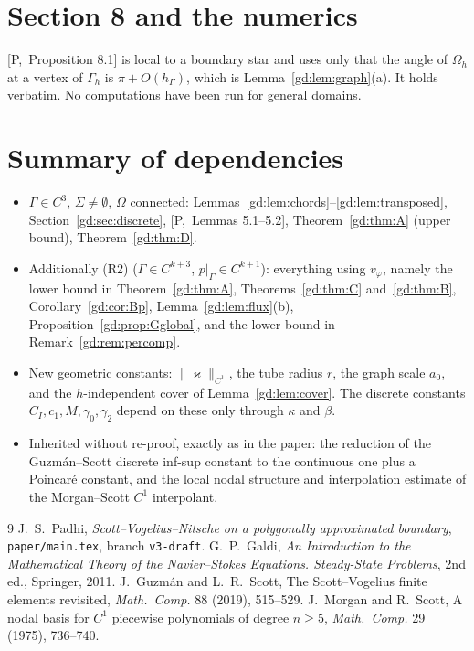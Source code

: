 \documentclass[11pt,reqno]{amsart}
\theoremstyle{plain}
\theoremstyle{definition}
\newcommand{\hG}{h_\Gamma}
\newcommand{\Gh}{\Gamma_h}
\newcommand{\Oh}{\Omega_h}
\newcommand{\norm}[1]{\lVert #1\rVert}
\newcommand{\kap}{\varkappa}            %
\newcommand{\Pref}[1]{\textup{[P,~#1]}}
\begin{document}
\section{Section 8 and the numerics}
\Pref{Proposition 8.1} is local to a boundary star and uses only that the angle of $\Oh$ at a vertex of $\Gh$ is $\pi+O(\hG)$, which is Lemma~\ref{gd:lem:graph}(a). It holds verbatim. No computations have been run for general domains.

\section{Summary of dependencies}
\begin{itemize}
\item $\Gamma\in C^3$, $\Sigma\ne\emptyset$, $\Omega$ connected: Lemmas~\ref{gd:lem:chords}--\ref{gd:lem:transposed}, Section~\ref{gd:sec:discrete}, \Pref{Lemmas 5.1--5.2}, Theorem~\ref{gd:thm:A} (upper bound), Theorem~\ref{gd:thm:D}.
\item Additionally (R2) ($\Gamma\in C^{k+3}$, $p|_\Gamma\in C^{k+1}$): everything using $v_\varphi$, namely the lower bound in Theorem~\ref{gd:thm:A}, Theorems~\ref{gd:thm:C} and~\ref{gd:thm:B}, Corollary~\ref{gd:cor:Bp}, Lemma~\ref{gd:lem:flux}(b), Proposition~\ref{gd:prop:Gglobal}, and the lower bound in Remark~\ref{gd:rem:percomp}.
\item New geometric constants: $\norm{\kap}_{C^1}$, the tube radius $r$, the graph scale $a_0$, and the $h$-independent cover of Lemma~\ref{gd:lem:cover}. The discrete constants $C_I,c_1,M,\gamma_0,\gamma_2$ depend on these only through $\kappa$ and $\beta$.
\item Inherited without re-proof, exactly as in the paper: the reduction of the Guzm\'an--Scott discrete inf-sup constant to the continuous one plus a Poincar\'e constant, and the local nodal structure and interpolation estimate of the Morgan--Scott $C^1$ interpolant.
\end{itemize}

\begin{thebibliography}{9}
 J.~S.~Padhi, \emph{Scott--Vogelius--Nitsche on a polygonally approximated boundary}, \texttt{paper/main.tex}, branch \texttt{v3-draft}.
 G.~P.~Galdi, \emph{An Introduction to the Mathematical Theory of the Navier--Stokes Equations. Steady-State Problems}, 2nd ed., Springer, 2011.
 J.~Guzm\'an and L.~R.~Scott, The Scott--Vogelius finite elements revisited, \emph{Math.\ Comp.} 88 (2019), 515--529.
 J.~Morgan and R.~Scott, A nodal basis for $C^1$ piecewise polynomials of degree $n\ge5$, \emph{Math.\ Comp.} 29 (1975), 736--740.
\end{thebibliography}
\end{document}
